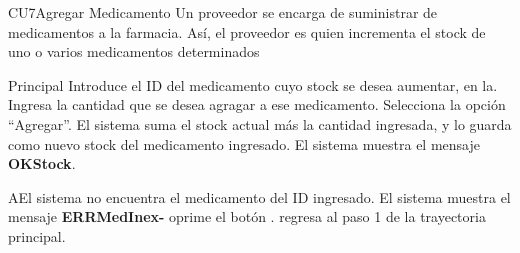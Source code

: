 
% 



	\begin{UseCase}{CU7}{Agregar Medicamento}{
		Un proveedor se encarga de suministrar de medicamentos a la farmacia. Así, el proveedor es quien incrementa el stock de uno o varios medicamentos determinados
	}
	\end{UseCase}

	\begin{UCtrayectoria}{Principal}
		\UCpaso[\UCactor] Introduce el ID del medicamento cuyo stock se desea aumentar, en la\label{CU7IntroduceMedicamentos}.
		\UCpaso[\UCactor] Ingresa la cantidad que se desea agragar a ese medicamento. 
		\UCpaso[\UCactor] Selecciona la opción ``Agregar''. 
		\UCpaso El sistema suma el stock actual m\'as la cantidad ingresada, y lo guarda como nuevo stock del medicamento ingresado.
		\UCpaso El sistema muestra el mensaje {\bf OKStock}.
	\end{UCtrayectoria}
		
		\begin{UCtrayectoriaA}{A}{El sistema no encuentra el medicamento del ID ingresado.}
			\UCpaso El sistema muestra el mensaje {\bf ERRMedInex-}
			\UCpaso[\UCactor] oprime el botón .  
			\UCpaso[\UCactor] regresa al paso 1 de la trayectoria principal.  
		\end{UCtrayectoriaA}
		
		
	
		

